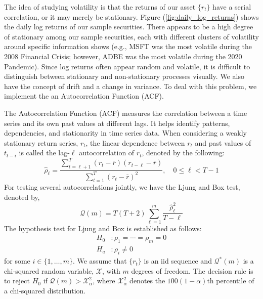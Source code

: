 \documentclass[12pt]{article}
\begin{document}
The idea of studying volatility is that the returns of our asset $\lbrace r_t\rbrace$ have a serial correlation, or it may merely be stationary. Figure (\ref{fig:daily_log_returns}) shows the daily log returns of our sample securities. There appears to be a high degree of stationary among our sample securities, each with different clusters of volatility around specific information shows (e.g., MSFT was the most volatile during the 2008 Financial Crisis; however, ADBE was the most volatile during the 2020 Pandemic). Since log returns often appear random and volatile, it is difficult to distinguish between stationary and non-stationary processes visually. We also have the concept of drift and a change in variance. To deal with this problem, we implement the an Autocorrelation Function (ACF).

The Autocorrelation Function (ACF) measures the correlation between a time series and its own past values at different lags. It helps identify patterns, dependencies, and stationarity in time series data. When considering a weakly stationary return series, $r_t$, the linear dependence between $r_t$ and past values of $t_{t-i}$ is called the lag-$\ell$ autocorrelation of $r_t$, denoted by the following:
\begin{equation}
	\hat{\rho}_\ell=\frac{\sum_{t=\ell+1}^{T}\left(r_t-\bar{r}\right)\left(r_{t-\ell}-\bar{r}\right)}{\sum_{t=1}^{T}\left(r_t-\bar{r}\right)^2},\quad 0\leq\ell<T-1
\end{equation}
For testing several autocorrelations jointly, we have the Ljung and Box test, denoted by,
\begin{equation}
	\mathcal{Q}(m)=T(T+2)\sum_{\ell=1}^{m}\frac{\hat{\rho}_\ell^2}{T-\ell}
\end{equation}
The hypothesis test for Ljung and Box is established as follows:
\[
\begin{aligned}
	H_0&:\rho_1=\cdots=\rho_m=0\\
	H_a&:\rho_i\neq 0
\end{aligned}
\]
for some $i\in\lbrace1,\ldots,m\rbrace$. We assume that $\lbrace r_t\rbrace$ is an iid sequence and $\mathcal{Q}^*(m)$ is a chi-squared random variable, $\mathcal{X}$, with $m$ degrees of freedom. The decision rule is to reject $H_0$ if $\mathcal{Q}(m)>\mathcal{X}^2_\alpha$, where $\mathcal{X}^2_\alpha$ denotes the $100\left(1-\alpha\right)$th percentile of a chi-squared distribution. 
\end{document}
